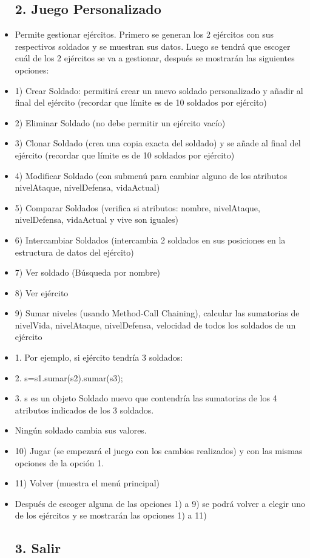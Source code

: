 \documentclass{article}
\begin{document}
\begin{itemize}
	\subsection{2. Juego Personalizado}
			\item Permite gestionar ejércitos. Primero se generan los 2 ejércitos con sus respectivos soldados y se muestran sus datos.
			Luego se tendrá que escoger cuál de los 2 ejércitos se va a gestionar, después se mostrarán las siguientes opciones:
			\item 1) Crear Soldado: permitirá crear un nuevo soldado personalizado y añadir al final del ejército (recordar que límite es de 10 soldados por ejército)
			\item 2) Eliminar Soldado (no debe permitir un ejército vacío)
			\item 3) Clonar Soldado (crea una copia exacta del soldado) y se añade al final del ejército (recordar que límite es de 10 soldados por ejército)
			\item 4) Modificar Soldado (con submenú para cambiar alguno de los atributos nivelAtaque, nivelDefensa, vidaActual)
			\item 5) Comparar Soldados (verifica si atributos: nombre, nivelAtaque, nivelDefensa, vidaActual y vive son iguales)
			\item 6) Intercambiar Soldados (intercambia 2 soldados en sus posiciones en la estructura de datos del ejército)
			\item 7) Ver soldado (Búsqueda por nombre)
			\item 8) Ver ejército
			\item 9) Sumar niveles (usando Method-Call Chaining), calcular las sumatorias de nivelVida, nivelAtaque, nivelDefensa, velocidad de todos los soldados de un ejército 
			\item 1. Por ejemplo, si ejército tendría 3 soldados:
			\item 2. s=s1.sumar(s2).sumar(s3);
			\item 3. s es un objeto Soldado nuevo que contendría las sumatorias de los 4 atributos indicados de los 3 soldados.
			\item Ningún soldado cambia sus valores.
			\item 10) Jugar (se empezará el juego con los cambios realizados) y con las mismas opciones de la opción 1.
			\item 11) Volver (muestra el menú principal)
			\item Después de escoger alguna de las opciones 1) a 9) se podrá volver a elegir uno de los ejércitos y se mostrarán las opciones 1) a 11)
		\subsection{3. Salir}
	\end{itemize}
		
\end{document}
